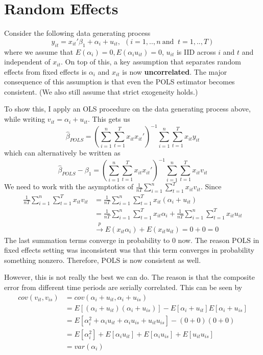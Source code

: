 \section{Random Effects}
Consider the following data generating process
\[
y_{it}=x_{it}'\beta_1 + \alpha_i +u_{it}, \ \ (i=1,..,n \ \text{and } \ t=1,..,T)
\]
where we assume that $E(\alpha_i)=0, E(\alpha_i u_{it})=0$, $u_{it}$ is IID across $i$ and $t$ and independent of $x_{it}$. On top of this, a key assumption that separates random effects from fixed effects is $\alpha_i$ and $x_{it}$ is now \textbf{uncorrelated}. The major consequence of this assumption is that even the POLS estimator becomes consistent. (We also still assume that strict exogeneity holds.) \par
To show this, I apply an OLS procedure on the data generating process above, while writing $v_{it}=\alpha_i + u_{it}$. This gets us
\[
\hat{\beta}_{POLS}=\left( \sum_{i=1}^n\sum_{t=1}^T x_{it} x_{it}'\right)^{-1}\sum_{i=1}^n\sum_{t=1}^T x_{it} y_{it}
\]
which can alternatively be written as
\[
\hat{\beta}_{POLS}-\beta_1 =\left( \sum_{i=1}^n\sum_{t=1}^T x_{it} x_{it}'\right)^{-1}\sum_{i=1}^n\sum_{t=1}^T x_{it} v_{it}
\]
We need to work with the asymptotics of $\frac{1}{nT}\sum_{i=1}^n\sum_{t=1}^T x_{it} v_{it}$. Since
\begin{align*}
\frac{1}{nT}\sum_{i=1}^n\sum_{t=1}^T x_{it} v_{it}&=\frac{1}{nT}\sum_{i=1}^n\sum_{t=1}^T x_{it} (\alpha_i+ u_{it})\\
&=\frac{1}{nT}\sum_{i=1}^n\sum_{t=1}^T x_{it}\alpha_i+ \frac{1}{nT}\sum_{i=1}^n\sum_{t=1}^T x_{it}u_{it}\\
&\xrightarrow{p} E(x_{it}\alpha_i)+E(x_{it}u_{it})=0+0=0
\end{align*}
The last summation terms converge in probability to 0 now. The reason POLS in fixed effects setting was inconsistent was that this term converges in probability something nonzero. Therefore, POLS is now consistent as well. \par
However, this is not really the best we can do. The reason is that the composite error from different time periods are serially correlated. This can be seen by
\[
\begin{aligned}
cov(v_{it},v_{is})&=cov(\alpha_i + u_{it},\alpha_i + u_{is})\\
&=E[(\alpha_i + u_{it})(\alpha_i + u_{is})]-E[\alpha_i + u_{it}]E[\alpha_i + u_{is}]\\
&=E[\alpha_i^2 + \alpha_iu_{it}+\alpha_iu_{is}+u_{it}u_{is}]-(0+0)(0+0)\\
&=E[\alpha_i^2] + E[\alpha_iu_{it}]+E[\alpha_iu_{is}]+E[u_{it}u_{is}]\\
&=var(\alpha_i)\\
\end{aligned}
\]
